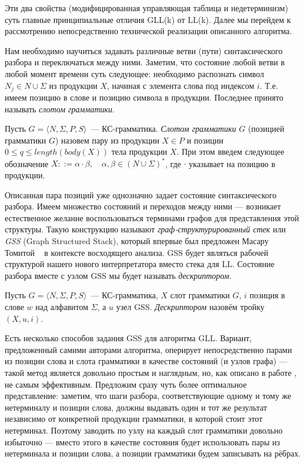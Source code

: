 Эти два свойства (модифицированная управляющая таблица и недетерминизм) суть главные принципиальные отличия GLL(k) от LL(k). Далее мы перейдем к рассмотрению непосредственно технической реализации описанного алгоритма.

Нам необходимо научиться задавать различные ветви (пути) синтаксического разбора и переключаться между ними. Заметим, что состояние любой ветви в любой момент времени суть следующее: необходимо распознать символ $N_j \in N \cup \Sigma$ из продукции $X$, начиная с элемента слова под индексом $i$. Т.е. имеем позицию в слове и позицию символа в продукции. Последнее принято называть \textit{слотом грамматики}.

\begin{definition}
  Пусть $G = \langle N, \Sigma, P, S \rangle$~--- КС-грамматика. \textit{Слотом грамматики} $G$ (позицией грамматики $G$) назовем пару из продукции $X \in P$ и позиции $0 \leq q \leq length(body(X))$ тела продукции $X$. При этом введем следующее обозначение $X ::= \alpha \cdot \beta, \quad \alpha,\beta \in (N \cup \Sigma)^*$, где $ \cdot $ указывает на позицию в продукции.
\end{definition}

Описанная пара позиций уже однозначно задает состояние синтаксического разбора. Имеем множество состояний и переходов между ними --- возникает естественное желание воспользоваться терминами графов для представления этой структуры. Такую конструкцию называют \textit{граф-структурированный стек} или \textit{GSS} (Graph Structured Stack), который впервые был предложен Масару Томитой ~\cite{tomita1988graph} в контексте восходящего анализа. GSS будет являться рабочей структурой нашего нового интерпретатора вместо стека для LL. Состояние разбора вместе с узлом GSS мы будет называть \textit{дескриптором}.

\begin{definition}
  Пусть $G = \langle N, \Sigma, P, S \rangle$~--- КС-грамматика, $X$ слот грамматики $G$, $i$ позиция в слове $ w $ над алфавитом $\Sigma$, а $ u $ узел GSS. \textit{Дескриптором} назовём тройку $ (X, u, i) $.
\end{definition}

Есть несколько способов задания GSS для алгоритма GLL. Вариант, предложенный самими авторами алгоритма, оперирует непосредственно парами из позиции слова и слота грамматики в качестве состояний (и узлов графа) --- такой метод является довольно простым и наглядным, но, как описано в работе \cite{10.1007/978-3-662-46663-6_5}, не самым эффективным. Предложим сразу чуть более оптимальное представление: заметим, что шаги разбора, соответствующие одному и тому же нетерминалу и позиции слова, должны выдавать один и тот же результат независимо от конкретной продукции грамматики, в которой стоит этот нетерминал. Поэтому заводить по узлу на каждый слот грамматики довольно избыточно --- вместо этого в качестве состояния будет использовать пары из нетерминала и позиции слова, а позиции грамматики будем записывать на рёбрах.

